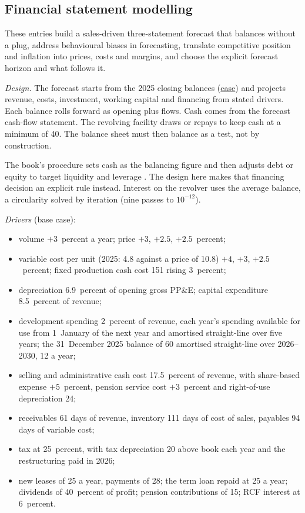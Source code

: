 \subsection{Financial statement modelling}

These entries build a sales-driven three-statement forecast that balances without a plug, address behavioural biases in forecasting, translate competitive position and inflation into prices, costs and margins, and choose the explicit forecast horizon and what follows it.

\begin{qfexample}\label{ex:harbour-pro-forma-model}
 \emph{Design.} The forecast starts from the 2025 closing balances (\hyperref[ex:harbour-tools-statements]{case}) and projects revenue, costs, investment, working capital and financing from stated drivers. Each balance rolls forward as opening plus flows. Cash comes from the forecast cash-flow statement. The revolving facility draws or repays to keep cash at a minimum of 40. The balance sheet must then balance as a test, not by construction.

The book's procedure sets cash as the balancing figure and then adjusts debt or equity to target liquidity and leverage \citep[pp.~494--498]{financial-statement-analysis-2009}. The design here makes that financing decision an explicit rule instead. Interest on the revolver uses the average balance, a circularity solved by iteration (nine passes to $10^{-12}$).

\emph{Drivers} (base case):
\begin{itemize}
\item volume $+3$~percent a year; price $+3$, $+2.5$, $+2.5$~percent;
\item variable cost per unit (2025: 4.8 against a price of 10.8) $+4$, $+3$, $+2.5$~percent; fixed production cash cost 151 rising 3~percent;
\item depreciation 6.9~percent of opening gross PP\&E; capital expenditure 8.5~percent of revenue;
\item development spending 2~percent of revenue, each year's spending available for use from 1~January of the next year and amortised straight-line over five years; the 31~December 2025 balance of 60 amortised straight-line over 2026--2030, 12 a year;
\item selling and administrative cash cost 17.5~percent of revenue, with share-based expense $+5$~percent, pension service cost $+3$~percent and right-of-use depreciation 24;
\item receivables 61 days of revenue, inventory 111 days of cost of sales, payables 94 days of variable cost;
\item tax at 25~percent, with tax depreciation 20 above book each year and the restructuring paid in 2026;
\item new leases of 25 a year, payments of 28; the term loan repaid at 25 a year; dividends of 40~percent of profit; pension contributions of 15; RCF interest at 6~percent.
\end{itemize}


\end{qfexample}
